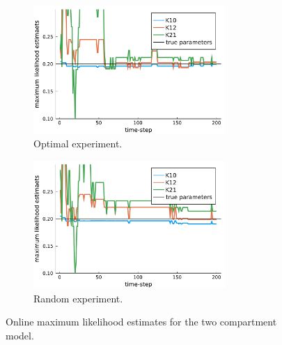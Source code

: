 \begin{figure}[H]
	\begin{subfigure}[b]{0.45\textwidth}
		\includegraphics[width=0.8\textwidth]{figure/paper 3/online estimate2opt}
		\caption{Optimal experiment.}
	\end{subfigure}
	\begin{subfigure}[b]{0.45\textwidth}
		\includegraphics[width=0.8\textwidth]{figure/paper 3/online estimate2rand}
		\caption{Random experiment.}
	\end{subfigure}
	\caption{Online maximum likelihood estimates for the two compartment model.}
	\label{figOnline2}
\end{figure}
